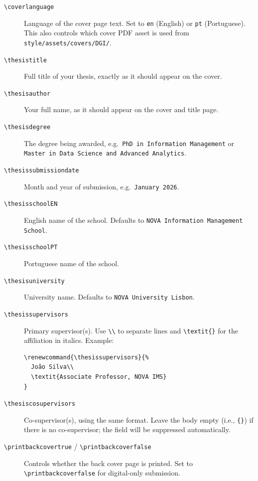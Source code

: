 \begin{description}
  \item[\texttt{\textbackslash coverlanguage}]
        Language of the cover page text.  Set to \texttt{en} (English) or
        \texttt{pt} (Portuguese).  This also controls which cover PDF asset is
        used from \texttt{style/assets/covers/DGI/}.

  \item[\texttt{\textbackslash thesistitle}]
        Full title of your thesis, exactly as it should appear on the cover.

  \item[\texttt{\textbackslash thesisauthor}]
        Your full name, as it should appear on the cover and title page.

  \item[\texttt{\textbackslash thesisdegree}]
        The degree being awarded, e.g.\ \texttt{PhD in Information Management}
        or \texttt{Master in Data Science and Advanced Analytics}.

  \item[\texttt{\textbackslash thesissubmissiondate}]
        Month and year of submission, e.g.\ \texttt{January 2026}.

  \item[\texttt{\textbackslash thesisschoolEN}]
        English name of the school.  Defaults to
        \texttt{NOVA Information Management School}.

  \item[\texttt{\textbackslash thesisschoolPT}]
        Portuguese name of the school.

  \item[\texttt{\textbackslash thesisuniversity}]
        University name.  Defaults to \texttt{NOVA University Lisbon}.

  \item[\texttt{\textbackslash thesissupervisors}]
        Primary supervisor(s).  Use \texttt{\textbackslash\textbackslash} to
        separate lines and \texttt{\textbackslash textit\{\}} for the
        affiliation in italics.  Example:
\begin{verbatim}
\renewcommand{\thesissupervisors}{%
  João Silva\\
  \textit{Associate Professor, NOVA IMS}
}
\end{verbatim}

  \item[\texttt{\textbackslash thesiscosupervisors}]
        Co-supervisor(s), using the same format.  Leave the body empty
        (i.e., \texttt{\{\}}) if there is no co-supervisor; the field will
        be suppressed automatically.

  \item[\texttt{\textbackslash printbackcovertrue} / \texttt{\textbackslash printbackcoverfalse}]
        Controls whether the back cover page is printed.  Set to
        \texttt{\textbackslash printbackcoverfalse} for digital-only submission.
\end{description}

